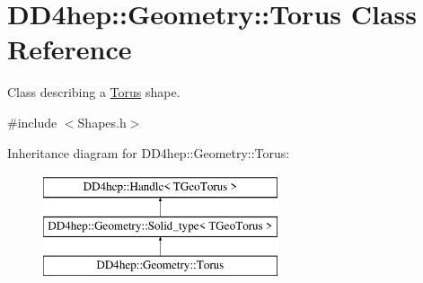 \hypertarget{class_d_d4hep_1_1_geometry_1_1_torus}{}\section{D\+D4hep\+:\+:Geometry\+:\+:Torus Class Reference}
\label{class_d_d4hep_1_1_geometry_1_1_torus}


Class describing a \hyperlink{class_d_d4hep_1_1_geometry_1_1_torus}{Torus} shape.  




{\ttfamily \#include $<$Shapes.\+h$>$}

Inheritance diagram for D\+D4hep\+:\+:Geometry\+:\+:Torus\+:\begin{figure}[H]
\begin{center}
\leavevmode
\includegraphics[height=3.000000cm]{class_d_d4hep_1_1_geometry_1_1_torus}
\end{center}
\end{figure}
